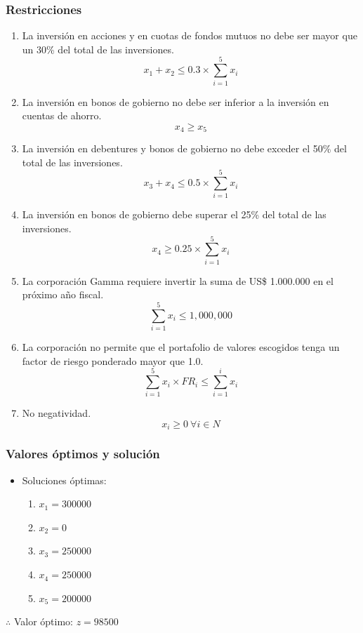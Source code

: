 \documentclass[a4paper,12pt]{article}
\begin{document}
\subsubsection{Restricciones}
\begin{enumerate}
	\item La inversión en acciones y en cuotas de fondos mutuos no debe ser mayor que un
	30\% del total de  las  inversiones.
	\begin{equation*}
		x_1 + x_2 \leq 0.3\times\sum_{i = 1}^{5}x_i
	\end{equation*}
	\item La  inversión  en  bonos  de  gobierno  no  debe  ser  inferior  a  la  inversión  en  cuentas  de  ahorro.
	\begin{equation*}
		x_4 \geq x_5
	\end{equation*}
	\item La inversión en debentures y bonos de gobierno no debe exceder el 50\% del total de las inversiones.
	\begin{equation*}
		x_3 + x_4 \leq 0.5\times\sum_{i = 1}^{5}x_i
	\end{equation*}
	\item La inversión en bonos de gobierno debe superar el 25\% del total de las inversiones.
	\begin{equation*}
		x_4 \geq 0.25\times\sum_{i = 1}^{5}x_i
	\end{equation*}
	\item La corporación Gamma    requiere invertir  la  suma  de  US\$  1.000.000  en el  próximo  año  fiscal.
	\begin{equation*}
		\sum_{i = 1}^{5}x_i \leq 1,000,000
	\end{equation*} 
	\item La corporación  no  permite  que el  portafolio  de  valores  escogidos  tenga  un  factor de  riesgo ponderado mayor que 1.0.
	\begin{equation*}
		\sum_{i = 1}^{5}x_i\times FR_i \leq \sum_{i = 1}^{i}x_i
	\end{equation*}
	\item No negatividad.
	\begin{equation*}
		x_i\geq 0\ \forall i \in N
	\end{equation*}
\end{enumerate}
\subsubsection{Valores óptimos y solución}
\begin{itemize}
	\item Soluciones óptimas:
	\begin{enumerate}
		\item $x_1=300000$
		\item $x_2=0$
		\item $x_3=250000$
		\item $x_4=250000$
		\item $x_5=200000$
	\end{enumerate}
\end{itemize}
$\therefore$ Valor óptimo: $z=98500$
\newpage
\end{document}
